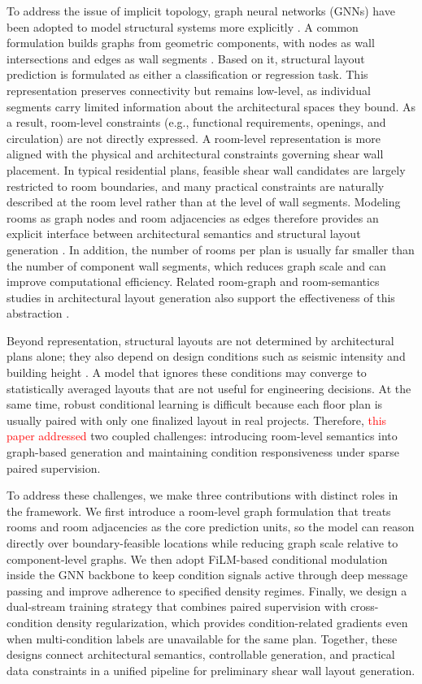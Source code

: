 To address the issue of implicit topology, graph neural networks (GNNs) have been adopted to model structural systems more explicitly \cite{Bronstein_2017,Hamilton_2020}. A common formulation builds graphs from geometric components, with nodes as wall intersections and edges as wall segments \cite{zhaoIntelligentDesignShear2023b}. Based on it, structural layout prediction is formulated as either a classification or regression task. This representation preserves connectivity but remains low-level, as individual segments carry limited information about the architectural spaces they bound. As a result, room-level constraints (e.g., functional requirements, openings, and circulation) are not directly expressed. A room-level representation is more aligned with the physical and architectural constraints governing shear wall placement. In typical residential plans, feasible shear wall candidates are largely restricted to room boundaries, and many practical constraints are naturally described at the room level rather than at the level of wall segments. Modeling rooms as graph nodes and room adjacencies as edges therefore provides an explicit interface between architectural semantics and structural layout generation \cite{nauataHouseGANRelationalGenerative2020}. In addition, the number of rooms per plan is usually far smaller than the number of component wall segments, which reduces graph scale and can improve computational efficiency. Related room-graph and room-semantics studies in architectural layout generation also support the effectiveness of this abstraction \cite{huGraph2PlanLearningFloorplan2020}.

Beyond representation, structural layouts are not determined by architectural plans alone; they also depend on design conditions such as seismic intensity and building height \cite{zhaoDesignconditioninformedShearWall2023d}. A model that ignores these conditions may converge to statistically averaged layouts that are not useful for engineering decisions. At the same time, robust conditional learning is difficult because each floor plan is usually paired with only one finalized layout in real projects. Therefore, \textcolor{red}{this paper addressed} two coupled challenges: introducing room-level semantics into graph-based generation and maintaining condition responsiveness under sparse paired supervision.

To address these challenges, we make three contributions with distinct roles in the framework. We first introduce a room-level graph formulation that treats rooms and room adjacencies as the core prediction units, so the model can reason directly over boundary-feasible locations while reducing graph scale relative to component-level graphs. We then adopt FiLM-based conditional modulation inside the GNN backbone to keep condition signals active through deep message passing and improve adherence to specified density regimes. Finally, we design a dual-stream training strategy that combines paired supervision with cross-condition density regularization, which provides condition-related gradients even when multi-condition labels are unavailable for the same plan. Together, these designs connect architectural semantics, controllable generation, and practical data constraints in a unified pipeline for preliminary shear wall layout generation.
